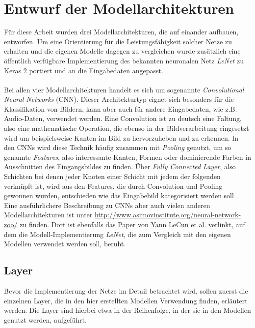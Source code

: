 \section{Entwurf der Modellarchitekturen}
Für diese Arbeit wurden drei Modellarchitekturen, die auf einander aufbauen, entworfen. Um eine Orientierung für die Leistungsfähigkeit solcher Netze zu erhalten und die eigenen Modelle dagegen zu vergleichen wurde zusätzlich eine öffentlich verfügbare Implementierung des bekannten neuronalen Netz \textit{LeNet} zu Keras 2 portiert und an die Eingabedaten angepasst. \\
\\
Bei allen vier Modellarchitekturen handelt es sich um sogenannte \textit{Convolutional Neural Networks} (CNN). Dieser Architekturtyp eignet sich besonders für die Klassifikation von Bildern, kann aber auch für andere Eingabedaten, wie z.B. Audio-Daten, verwendet werden. Eine Convolution ist zu deutsch eine Faltung, also eine mathematische Operation, die ebenso in der Bildverarbeitung eingesetzt wird um beispielsweise Kanten im Bild zu hervorzuheben und zu erkennen.
In den CNNs wird diese Technik häufig zusammen mit \textit{Pooling} genutzt, um so genannte \textit{Features}, also interessante Kanten, Formen oder dominierende Farben in Ausschnitten des Eingangsbildes zu finden. Über \textit{Fully Connected Layer}, also Schichten bei denen jeder Knoten einer Schicht mit jedem der folgenden verknüpft ist, wird aus den Features, die durch Convolution und Pooling gewonnen wurden, entschieden wie das Eingabebild kategorisiert werden soll \cite{nn-zoo}.
Eine ausführlichere Beschreibung zu CNNs aber auch vielen anderen Modellarchitekturen ist unter \url{http://www.asimovinstitute.org/neural-network-zoo/} zu finden. Dort ist ebenfalls das Paper \cite{lecun-98} von Yann LeCun et al. verlinkt, auf dem die Modell-Implementierung \textit{LeNet}, die zum Vergleich mit den eigenen Modellen verwendet werden soll, beruht.

\subsection{Layer}
Bevor die Implementierung der Netze im Detail betrachtet wird, sollen zuerst die einzelnen Layer, die in den hier erstellten Modellen Verwendung finden, erläutert werden. Die Layer sind hierbei etwa in der Reihenfolge, in der sie in den Modellen genutzt werden, aufgeführt.

